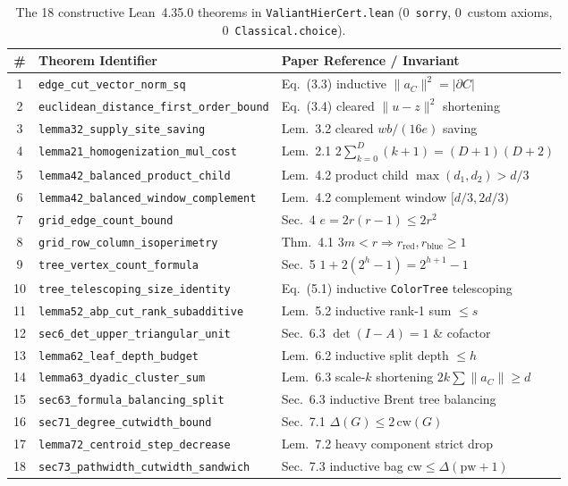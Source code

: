 \documentclass[10pt,twocolumn]{article}
\begin{document}
\begin{table}[t]
\centering
\tiny
\setlength{\tabcolsep}{3pt}
\caption{The 18 constructive Lean~4.35.0 theorems in \texttt{ValiantHierCert.lean} (0~\texttt{sorry}, 0~custom axioms, 0~\texttt{Classical.choice}).}
\label{tab:lean}
\begin{tabular}{@{}cll@{}}
\toprule
\# & Theorem Identifier & Paper Reference / Invariant \\
\midrule
1 & \texttt{edge\_cut\_vector\_norm\_sq} & Eq.~(3.3) inductive $\|a_C\|^2 = |\partial C|$ \\
2 & \texttt{euclidean\_distance\_first\_order\_bound} & Eq.~(3.4) cleared $\|u-z\|^2$ shortening \\
3 & \texttt{lemma32\_supply\_site\_saving} & Lem.~3.2 cleared $wb/(16e)$ saving \\
4 & \texttt{lemma21\_homogenization\_mul\_cost} & Lem.~2.1 $2\sum_{k=0}^D(k{+}1)=(D{+}1)(D{+}2)$ \\
5 & \texttt{lemma42\_balanced\_product\_child} & Lem.~4.2 product child $\max(d_1,d_2)>d/3$ \\
6 & \texttt{lemma42\_balanced\_window\_complement} & Lem.~4.2 complement window $[d/3,2d/3)$ \\
7 & \texttt{grid\_edge\_count\_bound} & Sec.~4 $e = 2r(r-1) \le 2r^2$ \\
8 & \texttt{grid\_row\_column\_isoperimetry} & Thm.~4.1 $3m<r \Rightarrow r_{\mathrm{red}},r_{\mathrm{blue}}\ge 1$ \\
9 & \texttt{tree\_vertex\_count\_formula} & Sec.~5 $1 + 2(2^h-1) = 2^{h+1}-1$ \\
10 & \texttt{tree\_telescoping\_size\_identity} & Eq.~(5.1) inductive \texttt{ColorTree} telescoping \\
11 & \texttt{lemma52\_abp\_cut\_rank\_subadditive} & Lem.~5.2 inductive rank-1 sum $\le s$ \\
12 & \texttt{sec6\_det\_upper\_triangular\_unit} & Sec.~6.3 $\det(I-A)=1$ \& cofactor \\
13 & \texttt{lemma62\_leaf\_depth\_budget} & Lem.~6.2 inductive split depth $\le h$ \\
14 & \texttt{lemma63\_dyadic\_cluster\_sum} & Lem.~6.3 scale-$k$ shortening $2k\sum\|a_C\|\ge d$ \\
15 & \texttt{sec63\_formula\_balancing\_split} & Sec.~6.3 inductive Brent tree balancing \\
16 & \texttt{sec71\_degree\_cutwidth\_bound} & Sec.~7.1 $\Delta(G) \le 2\,\mathrm{cw}(G)$ \\
17 & \texttt{lemma72\_centroid\_step\_decrease} & Lem.~7.2 heavy component strict drop \\
18 & \texttt{sec73\_pathwidth\_cutwidth\_sandwich} & Sec.~7.3 inductive bag $\mathrm{cw}\le\Delta(\mathrm{pw}{+}1)$ \\
\bottomrule
\end{tabular}
\end{table}
\end{document}
